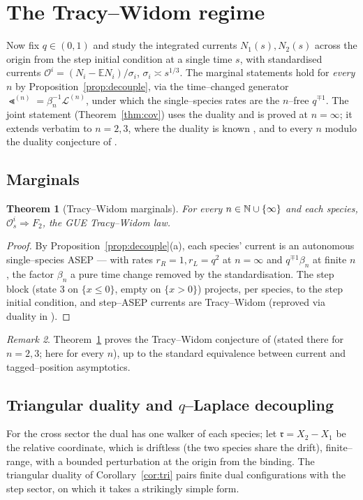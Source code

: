 \documentclass[11pt]{article}
\theoremstyle{plain}
\newtheorem{theorem}{Theorem}[section]
\theoremstyle{definition}
\theoremstyle{remark}
\newtheorem{remark}[theorem]{Remark}
\newcommand{\E}{\mathbb{E}}\newcommand{\PP}{\mathbb{P}}\newcommand{\dd}{\,\mathrm{d}}
\newcommand{\To}{\Rightarrow}\newcommand{\so}{\mathfrak{so}}
\newcommand{\cL}{\mathcal L}\newcommand{\cO}{\mathcal O}\newcommand{\cE}{\mathcal E}
\begin{document}
\section{The Tracy--Widom regime}\label{sec:tw}

Now fix $q\in(0,1)$ and study the integrated currents $N_1(s),N_2(s)$ across the origin
from the step initial condition at a single time $s$, with standardised currents
$\cO^i=(N_i-\E N_i)/\sigma_i$, $\sigma_i\asymp s^{1/3}$. The marginal statements hold
for \emph{every} $n$ by Proposition~\ref{prop:decouple}, via the time--changed
generator $\Lt^{(n)}=\beta_n^{-1}\cL^{(n)}$, under which the single--species rates
are the $n$--free $q^{\mp1}$. The joint statement (Theorem~\ref{thm:cov}) uses the
duality and is proved at $n=\infty$; it extends verbatim to $n=2,3$, where the
duality is known \cite{REU}, and to every $n$ modulo the duality conjecture of
\cite[Rmk.~4]{REU}.

\subsection{Marginals}
\begin{theorem}[Tracy--Widom marginals]\label{thm:marg}
For every $n\in\mathbb{N}\cup\{\infty\}$ and each species, $\cO^i_s\To F_2$, the GUE
Tracy--Widom law.
\end{theorem}
\begin{proof}
By Proposition~\ref{prop:decouple}(a), each species' current
is an autonomous single--species ASEP --- with rates $r_R=1,r_L=q^2$ at $n=\infty$ and
$q^{\mp1}\beta_n$ at finite $n$, the factor $\beta_n$ a pure time change removed by
the standardisation. The step block (state $3$ on $\{x\le0\}$, empty on $\{x>0\}$)
projects, per species, to the step initial condition, and step--ASEP currents are
Tracy--Widom \cite{TW2009} (reproved via duality in \cite{BCS}).
\end{proof}

\begin{remark}
Theorem~\ref{thm:marg} proves the Tracy--Widom conjecture of \cite[\S3.1.1]{REU}
(stated there for $n=2,3$; here for every $n$), up to the standard equivalence
between current and tagged--position asymptotics.
\end{remark}

\subsection{Triangular duality and $q$--Laplace decoupling}
For the cross sector the dual has one walker of each species; let
$\mathfrak r=X_2-X_1$ be the relative coordinate, which is driftless (the two species
share the drift), finite--range, with a bounded perturbation at the origin from the
binding. The triangular duality of Corollary~\ref{cor:tri} pairs finite dual
configurations with the step sector, on which it takes a strikingly simple form.
\end{document}
